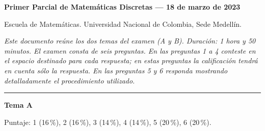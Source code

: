 \documentclass[11pt]{article}
\begin{document}
{\large\bfseries Primer Parcial de Matemáticas Discretas --- 18 de marzo de 2023}

\medskip
\noindent Escuela de Matemáticas. Universidad Nacional de Colombia, Sede Medellín.

\medskip
\noindent\textit{Este documento reúne los dos temas del examen (A y B). Duración: 1 hora y 50 minutos. El examen consta de seis preguntas. En las preguntas 1 a 4 conteste en el espacio destinado para cada respuesta; en estas preguntas la calificación tendrá en cuenta sólo la respuesta. En las preguntas 5 y 6 responda mostrando detalladamente el procedimiento utilizado.}

\bigskip
\hrule
\bigskip

\begin{center}\bfseries\large Tema A\end{center}

\noindent Puntaje: 1 (16\,\%), 2 (16\,\%), 3 (14\,\%), 4 (14\,\%), 5 (20\,\%), 6 (20\,\%).
\end{document}
